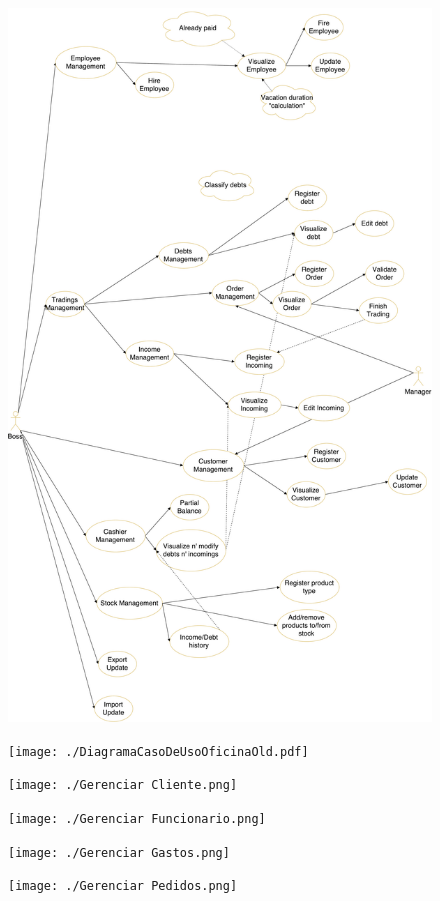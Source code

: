 \documentclass[a4paper,12pt]{article}
\begin{document}
		\begin{figure}[H]
			\centering \includegraphics[width=\textwidth]{./UseCasesDiagramEnglish.pdf}
		\end{figure}
		\begin{figure}[H]
			\centering \texttt{[image: ./DiagramaCasoDeUsoOficinaOld.pdf]} 
		\end{figure}
		\begin{figure}[H]
			\centering \texttt{[image: ./Gerenciar Cliente.png]}
		\end{figure}
		\begin{figure}[H]
			\centering \texttt{[image: ./Gerenciar Funcionario.png]} 
		\end{figure}
		\begin{figure}[H]
			\centering \texttt{[image: ./Gerenciar Gastos.png]} 
		\end{figure}
		\begin{figure}[H]
			\centering \texttt{[image: ./Gerenciar Pedidos.png]}
		\end{figure}
\end{document}
